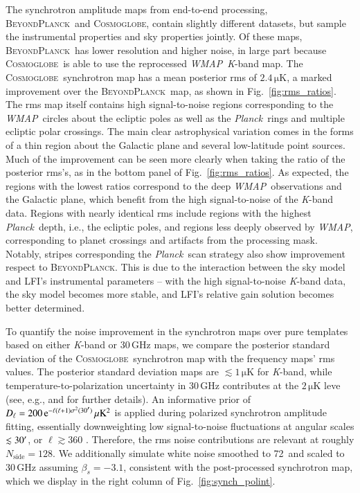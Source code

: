 \documentclass[twocolumn]{../../common/aa}
\def\WMAP{\emph{WMAP}}
\def\Planck{\emph{Planck}}
\newcommand{\bp}{\textsc{BeyondPlanck}}
\newcommand{\cosmoglobe}{\textsc{Cosmoglobe}}
\newcommand{\K}[0]{\textit K}
\newcommand{\e}{\mathrm e}
\begin{document}
The synchrotron amplitude maps from end-to-end processing, \bp\ and \cosmoglobe, contain slightly different datasets, but sample the instrumental properties and sky properties jointly. Of these maps, \bp\ has lower resolution and higher noise, in large part because \cosmoglobe\ is able to use the reprocessed \WMAP\ \K-band map.
The \cosmoglobe\ synchrotron map has a mean posterior rms of $2.4\,\mathrm{\mu K}$, a marked improvement over the \bp\ map, as shown in Fig.~\ref{fig:rms_ratios}. The rms map itself contains high signal-to-noise regions corresponding to the \WMAP\ circles about the ecliptic poles as well as the \Planck\ rings and multiple ecliptic polar crossings. The main clear astrophysical variation comes in the forms of a thin region about the Galactic plane and several low-latitude point sources. Much of the improvement can be seen more clearly when taking the ratio of the posterior rms's, as in the bottom panel of Fig.~\ref{fig:rms_ratios}. As expected, the regions with the lowest ratios correspond to the deep \WMAP\ observations and the Galactic plane, which benefit from the high signal-to-noise of the \K-band data. Regions with nearly identical rms include regions with the highest \Planck\ depth, i.e., the ecliptic poles, and regions less deeply observed by \WMAP, corresponding to planet crossings and artifacts from the processing mask. Notably, stripes corresponding the \Planck\ scan strategy also show improvement respect to \bp. This is due to the interaction between the sky model and LFI's instrumental parameters -- with the high signal-to-noise \K-band data, the sky model becomes more stable, and LFI's relative gain solution becomes better determined.


To quantify the noise improvement in the synchrotron maps over pure templates based on either \K-band or 30\,GHz maps, we compare the posterior standard deviation of the \cosmoglobe\ synchrotron map with the frequency maps' rms values. The posterior standard deviation maps are $\lesssim1\,\mathrm{\mu K}$ for \K-band, while temperature-to-polarization uncertainty in 30\,GHz contributes at the $2\,\mathrm{\mu K}$ leve (see, e.g., \citealp{watts2023_dr1} and \citealp{bp10} for further details). An informative prior of $D_\ell=200\,\e^{-\ell(\ell+1)\sigma^2(30\arcm)}\,\mathrm{\mu K^2}$ is applied during polarized synchrotron amplitude fitting, essentially downweighting low signal-to-noise fluctuations at angular scales $\lesssim30\arcm$, or $\ell\gtrsim360$ \citep{bp14}. Therefore, the rms noise contributions are relevant at roughly $N_\mathrm{side}=128$. We additionally simulate white noise smoothed to 72\arcm\ and scaled to 30\,GHz assuming $\beta_s=-3.1$, consistent with the post-processed synchrotron map, which we display in the right column of Fig.~\ref{fig:synch_polint}.
\end{document}
